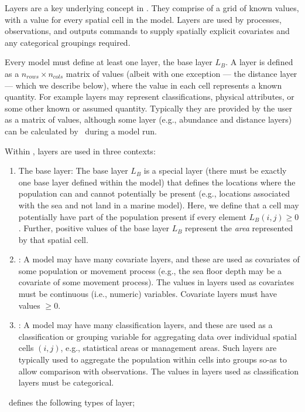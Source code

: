 Layers are a key underlying concept in \SPM. They comprise of a grid of known values, with a value for every spatial cell in the model. Layers are used by processes, observations, and outputs commands to supply spatially explicit covariates and any categorical groupings required. 

Every model must define at least one layer, the base layer $L_B$. A layer is defined as a $n_{rows} \times n_{cols}$ matrix of values (albeit with one exception --- the distance layer --- which we describe below), where the value in each cell represents a known quantity. For example layers may represent classifications, physical attributes, or some other known or assumed quantity. Typically they are provided by the user as a matrix of values, although some layer (e.g., abundance and distance layers) can be calculated by \SPM\ during a model run. 

Within \SPM, layers are used in three contexts:
\begin{enumerate}
\item The base layer: The base layer $L_B$ is a special layer (there must be exactly one base layer defined within the model) that defines the locations where the population can and cannot potentially be present (e.g., locations associated with the sea and not land in a marine model). Here, we define that a cell may potentially have part of the population present if every element $L_B(i,j) \ge 0$. Further, positive values of the base layer $L_B$ represent the \emph{area} represented by that spatial cell. 
\item {}: A model may have many covariate layers, and these are used as covariates of some population or movement process (e.g., the sea floor depth may be a covariate of some movement process). The values in layers used as covariates must be continuous (i.e., numeric) variables. Covariate layers must have values $\ge0$.
\item {}: A model may have many classification layers, and these are used as a classification or grouping variable for aggregating data over individual spatial cells $(i,j)$, e.g., statistical areas or management areas. Such layers are typically used to aggregate the population within cells into groups so-as to allow comparison with observations. The values in layers used as classification layers must be categorical.
\end{enumerate}

\SPM\ defines the following types of layer;

